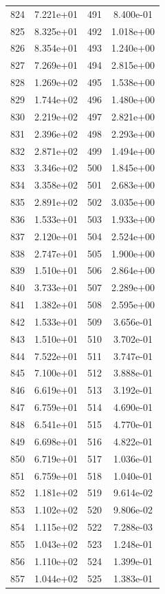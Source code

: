 \documentclass[12pt]{article}
\begin{document}
\begin{longtable}{@{}cccc@{}}
824 & 7.221e+01 & 491 & 8.400e-01 \\
825 & 8.325e+01 & 492 & 1.018e+00 \\
826 & 8.354e+01 & 493 & 1.240e+00 \\
827 & 7.269e+01 & 494 & 2.815e+00 \\
828 & 1.269e+02 & 495 & 1.538e+00 \\
829 & 1.744e+02 & 496 & 1.480e+00 \\
830 & 2.219e+02 & 497 & 2.821e+00 \\
831 & 2.396e+02 & 498 & 2.293e+00 \\
832 & 2.871e+02 & 499 & 1.494e+00 \\
833 & 3.346e+02 & 500 & 1.845e+00 \\
834 & 3.358e+02 & 501 & 2.683e+00 \\
835 & 2.891e+02 & 502 & 3.035e+00 \\
836 & 1.533e+01 & 503 & 1.933e+00 \\
837 & 2.120e+01 & 504 & 2.524e+00 \\
838 & 2.747e+01 & 505 & 1.900e+00 \\
839 & 1.510e+01 & 506 & 2.864e+00 \\
840 & 3.733e+01 & 507 & 2.289e+00 \\
841 & 1.382e+01 & 508 & 2.595e+00 \\
842 & 1.533e+01 & 509 & 3.656e-01 \\
843 & 1.510e+01 & 510 & 3.702e-01 \\
844 & 7.522e+01 & 511 & 3.747e-01 \\
845 & 7.100e+01 & 512 & 3.888e-01 \\
846 & 6.619e+01 & 513 & 3.192e-01 \\
847 & 6.759e+01 & 514 & 4.690e-01 \\
848 & 6.541e+01 & 515 & 4.770e-01 \\
849 & 6.698e+01 & 516 & 4.822e-01 \\
850 & 6.719e+01 & 517 & 1.036e-01 \\
851 & 6.759e+01 & 518 & 1.040e-01 \\
852 & 1.181e+02 & 519 & 9.614e-02 \\
853 & 1.102e+02 & 520 & 9.806e-02 \\
854 & 1.115e+02 & 522 & 7.288e-03 \\
855 & 1.043e+02 & 523 & 1.248e-01 \\
856 & 1.110e+02 & 524 & 1.399e-01 \\
857 & 1.044e+02 & 525 & 1.383e-01 \\

\end{longtable}
\end{document}

